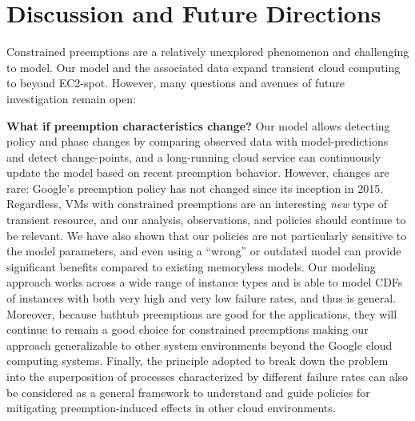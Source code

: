 \vspace*{\subsecspace}
\section{Discussion and Future Directions}
\label{sec:discussion}


Constrained preemptions are a relatively unexplored phenomenon and challenging to model.
Our model and the associated data expand transient cloud computing to beyond EC2-spot.
However, many questions and avenues of future investigation remain open:

\noindent \textbf{What if preemption characteristics change?}
Our model allows detecting policy and phase changes by comparing observed data with model-predictions and detect change-points, and 
a long-running cloud service can continuously update the model based on recent preemption behavior. 
However, changes are rare: Google's preemption policy has not changed since its inception in 2015. 
%
Regardless, VMs with constrained preemptions are an interesting \emph{new} type of transient resource, and our analysis, observations, and policies should continue to be relevant. 
%
We have also shown that our policies are not particularly sensitive to the model parameters, and even using a ``wrong'' or outdated model can provide significant benefits compared to existing memoryless models. 
Our modeling approach works across a wide range of instance types and is able to model CDFs of instances with both very high and very low failure rates, and thus is general. Moreover, because bathtub preemptions are good for the applications, they will continue to remain a good choice for constrained preemptions making our approach generalizable to other system environments beyond the Google cloud computing systems. Finally, the principle adopted to break down the problem into the superposition of processes characterized by different failure rates can also be considered as a general framework to understand and guide policies for mitigating preemption-induced effects in other cloud environments.

